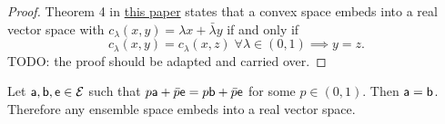 \begin{proof}
	Theorem 4 in \href{https://arxiv.org/abs/1105.1270}{this paper} states that a convex space embeds into a real vector space with $c_\lambda(x,y) = \lambda x + \bar{\lambda}y$ if and only if
	$$ c_\lambda(x,y) = c_\lambda(x,z) \; \forall \lambda \in (0,1) \implies y = z.$$ TODO: the proof should be adapted and carried over.
\end{proof}

\begin{thrm}
	Let $\ens[a], \ens[b], \ens \in \Ens$ such that $p\ens[a] + \bar{p} \ens = p \ens[b] + \bar{p} \ens$ for some $p \in (0,1)$. Then $\ens[a] = \ens[b]$. Therefore any ensemble space embeds into a real vector space.
\end{thrm}


